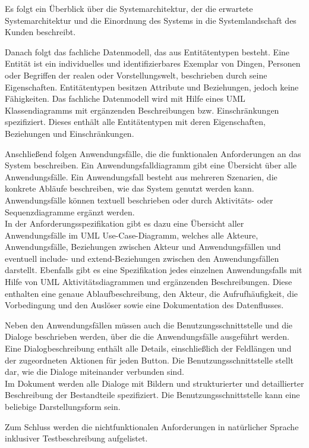 Es folgt ein Überblick über die Systemarchitektur, der die erwartete Systemarchitektur und die Einordnung des Systems 
in die Systemlandschaft des Kunden beschreibt.

Danach folgt das fachliche Datenmodell, das aus Entitätentypen besteht. Eine Entität ist ein individuelles 
und identifizierbares Exemplar von Dingen, Personen oder Begriffen der realen oder Vorstellungswelt, beschrieben 
durch seine Eigenschaften. Entitätentypen besitzen Attribute und Beziehungen, jedoch keine Fähigkeiten. Das fachliche 
Datenmodell wird mit Hilfe eines UML Klassendiagramms mit ergänzenden Beschreibungen bzw. Einschränkungen spezifiziert.
Dieses enthält alle Entitätentypen mit deren Eigenschaften, Beziehungen und Einschränkungen.

Anschließend folgen Anwendungsfälle, die die funktionalen Anforderungen an das System beschreiben. 
Ein Anwendungsfalldiagramm gibt eine Übersicht über alle Anwendungsfälle. Ein Anwendungsfall besteht aus mehreren 
Szenarien, die konkrete Abläufe beschreiben, wie das System genutzt werden kann. Anwendungsfälle können textuell 
beschrieben oder durch Aktivitäts- oder Sequenzdiagramme ergänzt werden.\\
In der Anforderungsspezifikation gibt es dazu eine Übersicht aller Anwendungsfälle im UML Use-Case-Diagramm, welches 
alle Akteure, Anwendungsfälle, Beziehungen zwischen Akteur und Anwendungsfällen und eventuell include- und extend-Beziehungen
zwischen den Anwendungsfällen darstellt. Ebenfalls gibt es eine Spezifikation jedes einzelnen Anwendungsfalls mit Hilfe 
von UML Aktivitätsdiagrammen und ergänzenden Beschreibungen. Diese enthalten eine genaue Ablaufbeschreibung, den Akteur, 
die Aufrufhäufigkeit, die Vorbedingung und den Auslöser sowie eine Dokumentation des Datenflusses. 

Neben den Anwendungsfällen müssen auch die Benutzungsschnittstelle und die Dialoge beschrieben werden, über die die Anwendungsfälle 
ausgeführt werden. Eine Dialogbeschreibung enthält alle Details, einschließlich der Feldlängen und der zugeordneten 
Aktionen für jeden Button. Die Benutzungsschnittstelle stellt dar, wie die Dialoge miteinander verbunden sind.\\
Im Dokument werden alle Dialoge mit Bildern und strukturierter und detaillierter Beschreibung der Bestandteile spezifiziert.
Die Benutzungsschnittstelle kann eine beliebige Darstellungsform sein.

Zum Schluss werden die nichtfunktionalen Anforderungen in natürlicher Sprache inklusiver Testbeschreibung aufgelistet.

